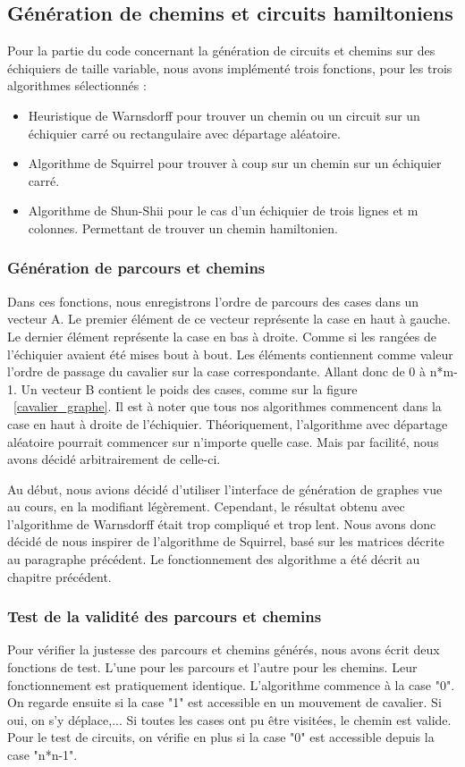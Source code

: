 \subsection{Génération de chemins et circuits hamiltoniens}
Pour la partie du code concernant la génération de circuits et chemins sur des échiquiers de taille variable, nous avons implémenté trois fonctions, pour les trois algorithmes sélectionnés :
\begin{itemize}
\item Heuristique de Warnsdorff pour trouver un chemin ou un circuit sur un échiquier carré ou rectangulaire avec départage aléatoire.
\item Algorithme de Squirrel pour trouver à coup sur un chemin sur un échiquier carré.
\item Algorithme de Shun-Shii pour le cas d'un échiquier de trois lignes et m colonnes. Permettant de trouver un chemin hamiltonien.
\end{itemize}
\subsubsection{Génération de parcours et chemins}
Dans ces fonctions, nous enregistrons l'ordre de parcours des cases dans un vecteur A. Le premier élément de ce vecteur représente la case en haut à gauche. Le dernier élément représente la case en bas à droite. Comme si les rangées de l'échiquier avaient été mises bout à bout. Les éléments contiennent comme valeur l'ordre de passage du cavalier sur la case correspondante. Allant donc de 0 à n*m-1. Un vecteur B contient le poids des cases, comme sur la figure ~\ref{cavalier_graphe}. Il est à noter que tous nos algorithmes commencent dans la case en haut à droite de l'échiquier. Théoriquement, l'algorithme avec départage aléatoire pourrait commencer sur n'importe quelle case. Mais par facilité, nous avons décidé arbitrairement de celle-ci.

Au début, nous avions décidé d'utiliser l'interface de génération de graphes vue au cours, en la modifiant légèrement. Cependant, le résultat obtenu avec l'algorithme de Warnsdorff était trop compliqué et trop lent. Nous avons donc décidé de nous inspirer de l'algorithme de Squirrel, basé sur les matrices décrite au paragraphe précédent.
Le fonctionnement des algorithme a été décrit au chapitre précédent. 

\subsubsection{Test de la validité des parcours et chemins}
Pour vérifier la justesse des parcours et chemins générés, nous avons écrit deux fonctions de test. L'une pour les parcours et l'autre pour les chemins. Leur fonctionnement est pratiquement identique. L'algorithme commence à la case "0". On regarde ensuite si la case "1" est accessible en un mouvement de cavalier. Si oui, on s'y déplace,... Si toutes les cases ont pu être visitées, le chemin est valide. Pour le test de circuits, on vérifie en plus si la case "0" est accessible depuis la case "n*n-1".

